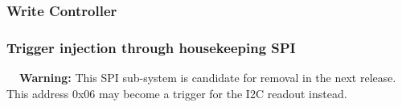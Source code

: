 \documentclass[a4paper,indent]{paper}
\newenvironment{warning}
{\par\begin{mdframed}[linewidth=2pt,linecolor=orange,backgroundcolor=orange!10]%
    \begin{list}{}{\leftmargin=0mm}\item[\bf\danger{}~~Warning: ]}
  {\end{list}\end{mdframed}\par}
\begin{document}
\subsubsection{Write Controller}
%
%
%
%
%
%
%
%



\subsubsection{Trigger injection through housekeeping \ac{SPI}}
\begin{warning}
  This \ac{SPI} sub-system is candidate for removal in the next release.
  This address 0x06 may become a trigger for the \ac{I2C} readout instead.
\end{warning}
\end{document}
